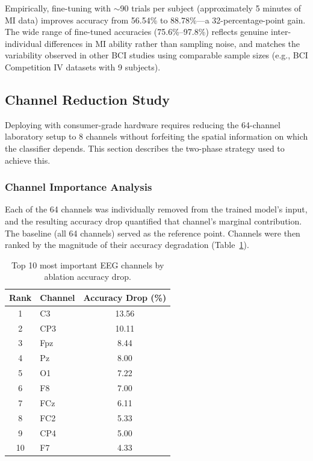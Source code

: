 \documentclass[12pt, a4paper]{article}
\begin{document}
Empirically, fine-tuning with $\sim$90 trials per subject (approximately 5 minutes of MI data) improves accuracy from 56.54\% to 88.78\%---a 32-percentage-point gain. The wide range of fine-tuned accuracies (75.6\%--97.8\%) reflects genuine inter-individual differences in MI ability rather than sampling noise, and matches the variability observed in other BCI studies using comparable sample sizes (e.g., BCI Competition IV datasets with 9 subjects).

\subsection{Channel Reduction Study}

Deploying with consumer-grade hardware requires reducing the 64-channel laboratory setup to 8 channels without forfeiting the spatial information on which the classifier depends. This section describes the two-phase strategy used to achieve this.

\subsubsection{Channel Importance Analysis}

Each of the 64 channels was individually removed from the trained model's input, and the resulting accuracy drop quantified that channel's marginal contribution. The baseline (all 64 channels) served as the reference point. Channels were then ranked by the magnitude of their accuracy degradation (Table~\ref{tab:channel_importance}).

\begin{table}[htbp]
\centering
\caption{Top 10 most important EEG channels by ablation accuracy drop.}
\label{tab:channel_importance}
\begin{tabular}{clc}
\toprule
\textbf{Rank} & \textbf{Channel} & \textbf{Accuracy Drop (\%)} \\
\midrule
1 & C3   & 13.56 \\
2 & CP3  & 10.11 \\
3 & Fpz  & 8.44 \\
4 & Pz   & 8.00 \\
5 & O1   & 7.22 \\
6 & F8   & 7.00 \\
7 & FCz  & 6.11 \\
8 & FC2  & 5.33 \\
9 & CP4  & 5.00 \\
10 & F7  & 4.33 \\
\bottomrule
\end{tabular}
\end{table}
\end{document}

